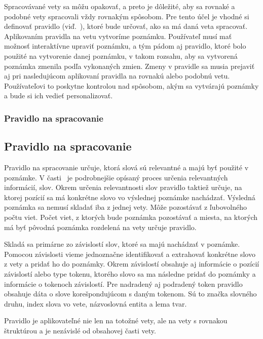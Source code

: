 Spracovávané vety sa môžu opakovať, a preto je dôležité, aby sa rovnaké a podobné vety spracovali vždy rovnakým spôsobom. Pre tento účel je vhodné si definovať pravidlo (viď.~), ktoré bude určovať, ako sa má daná veta spracovať. Aplikovaním pravidla na vetu vytvoríme poznámku. Používateľ musí mať možnosť interaktívne upraviť poznámku, a tým pádom aj pravidlo, ktoré bolo použité na vytvorenie danej poznámku, v takom rozsahu, aby sa vytvorená poznámka zmenila podľa vykonaných zmien. Zmeny v pravidle sa musia prejaviť aj pri nasledujúcom aplikovaní pravidla na rovnakú alebo podobnú vetu. Používateľovi to poskytne kontrolou nad spôsobom, akým sa vytvárajú poznámky a bude si ich vedieť personalizovať.

%
%
{
	\subsubsection{Pravidlo na spracovanie}
}
{
	\subsection{Pravidlo na spracovanie}
}
\label{subsubsection:rule_for_processing}
Pravidlo na spracovanie určuje, ktorá slová sú relevantné a majú byť použité v poznámke. V časti~ je podrobnejšie opísaný proces určenia relevantných informácií, slov. Okrem určenia relevantnosti slov pravidlo taktiež určuje, na ktorej pozícií sa má konkrétne slovo vo výslednej poznámke nachádzať. Výsledná poznámka sa nemusí skladať iba z jednej vety. Môže pozostávať z ľubovolného počtu viet. Počet viet, z ktorých bude poznámka pozostávať a miesta, na ktorých má byť pôvodná poznámka rozdelená na vety určuje pravidlo.

Skladá sa primárne zo závislostí slov, ktoré sa majú nachádzať v poznámke. Pomocou závislosti vieme jednoznačne identifikovať a extrahovať konkrétne slovo z vety a pridať ho do poznámky. Okrem závislostí obsahuje aj informácie o pozícií závislostí alebo type tokenu, ktorého slovo sa ma následne pridať do poznámky a informácie o tokenoch závislostí. Pre nadradený aj podradený token pravidlo obsahuje dáta o slove korešpondujúcom s daným tokenom. Sú to značka slovného druhu, index slova vo vete, názvoslovná entita a lema tvar.

Pravidlo je aplikovateľné nie len na totožné vety, ale na vety s rovnakou štruktúrou a je nezávislé od obsahovej časti vety.


